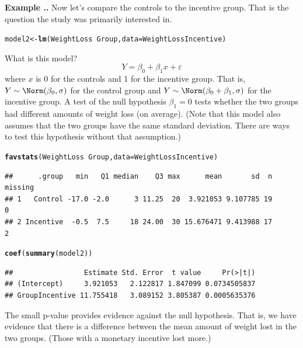 \documentclass[twoside]{book}\usepackage[]{graphicx}\usepackage[]{xcolor}
\makeatletter
\newcommand{\hlopt}[1]{\textcolor[rgb]{0,0,0}{#1}}%
\newcommand{\hlstd}[1]{\textcolor[rgb]{0.345,0.345,0.345}{#1}}%
\newcommand{\hlkwb}[1]{\textcolor[rgb]{0.69,0.353,0.396}{#1}}%
\newcommand{\hlkwc}[1]{\textcolor[rgb]{0.333,0.667,0.333}{#1}}%
\newcommand{\hlkwd}[1]{\textcolor[rgb]{0.737,0.353,0.396}{\textbf{#1}}}%
\newenvironment{kframe}{%
 \def\at@end@of@kframe{}%
 \ifinner\ifhmode%
  \def\at@end@of@kframe{\end{minipage}}%
  \begin{minipage}{\columnwidth}%
 \fi\fi%
 \def\FrameCommand##1{\hskip\@totalleftmargin \hskip-\fboxsep
 \colorbox{shadecolor}{##1}\hskip-\fboxsep
     \hskip-\linewidth \hskip-\@totalleftmargin \hskip\columnwidth}%
 \MakeFramed {\advance\hsize-\width
   \@totalleftmargin\z@ \linewidth\hsize
   \@setminipage}}%
 {\par\unskip\endMakeFramed%
 \at@end@of@kframe}
\newenvironment{knitrout}{}{} %
\newcounter{example}[section]
\newenvironment{example}%
{\refstepcounter{example}%
\textbf{Example \thesection.\arabic{example}. }}%
{}
\makeatother
\begin{document}
\begin{example}
	Now let's compare the controls to the incentive group.  That is the question 
	the study was primarily interested in.
\begin{knitrout}
\color{fgcolor}\begin{kframe}
\begin{alltt}
\hlstd{model2} \hlkwb{<-} \hlkwd{lm}\hlstd{(WeightLoss} \hlopt{~} \hlstd{Group,} \hlkwc{data} \hlstd{= WeightLossIncentive)}
\end{alltt}
\end{kframe}
\end{knitrout}
	What is this model?
	\[
	Y = \beta_0 + \beta_1 x + \varepsilon
	\]
where $x$ is 0 for the controls and 1 for the incentive group.  That is, $Y \sim \Norm(\beta_0, \sigma)$
for the control group and $Y \sim \Norm(\beta_0 + \beta_1, \sigma)$ for the incentive group.
A test of the null hypothesis $\beta_1 = 0$ tests whether the two groups had different amounts 
of weight loss (on average).   (Note that this model also assumes that the two groups have the same 
standard deviation.  There are ways to test this hypothesis without that assumption.)
\begin{knitrout}
\color{fgcolor}\begin{kframe}
\begin{alltt}
\hlkwd{favstats}\hlstd{(WeightLoss} \hlopt{~} \hlstd{Group,} \hlkwc{data} \hlstd{= WeightLossIncentive)}
\end{alltt}
\begin{verbatim}
##      .group   min   Q1 median    Q3 max      mean       sd  n missing
## 1   Control -17.0 -2.0      3 11.25  20  3.921053 9.107785 19       0
## 2 Incentive  -0.5  7.5     18 24.00  30 15.676471 9.413988 17       2
\end{verbatim}
\begin{alltt}
\hlkwd{coef}\hlstd{(}\hlkwd{summary}\hlstd{(model2))}
\end{alltt}
\begin{verbatim}
##                 Estimate Std. Error  t value     Pr(>|t|)
## (Intercept)     3.921053   2.122817 1.847099 0.0734505837
## GroupIncentive 11.755418   3.089152 3.805387 0.0005635376
\end{verbatim}
\end{kframe}
\end{knitrout}
The small p-value provides evidence against the null hypothesis.  That is, we have evidence that
there is a difference between the mean amount of weight lost in the two groups.  (Those with a monetary
incentive lost more.)  
\end{example}
\end{document}
